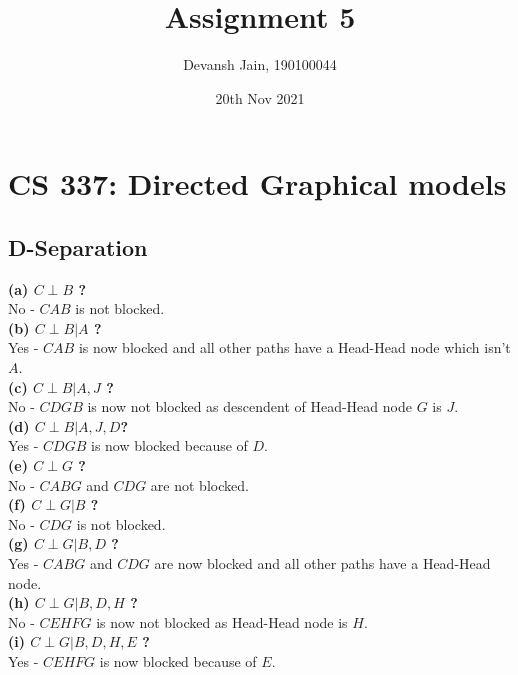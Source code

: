 \documentclass[12pt, fleqn]{article}
\title{Assignment 5}
\author{Devansh Jain, 190100044}
\date{20th Nov 2021}
\begin{document}
\maketitle
\tableofcontents
\thispagestyle{empty}
\setcounter{page}{0}

\newpage
\section{CS 337: Directed Graphical models}
\subsection{D-Separation}
\textbf{(a) $C \perp B$ ?} \\
No - $CAB$ is not blocked. \\

\textbf{(b) $C \perp B \vert A$ ?} \\
Yes - $CAB$ is now blocked and all other paths have a Head-Head node which isn't $A$. \\

\textbf{(c) $C \perp B \vert A, J$ ?} \\
No - $CDGB$ is now not blocked as descendent of Head-Head node $G$ is $J$. \\

\textbf{(d) $C \perp B \vert A, J, D$?} \\
Yes - $CDGB$ is now blocked because of $D$. \\

\textbf{(e) $C \perp G$ ?} \\
No - $CABG$ and $CDG$ are not blocked. \\

\textbf{(f) $C \perp G \vert B$ ?} \\
No - $CDG$ is not blocked. \\

\textbf{(g) $C \perp G \vert B, D$ ?} \\
Yes - $CABG$ and $CDG$ are now blocked and all other paths have a Head-Head node. \\

\textbf{(h) $C \perp G \vert B, D, H$ ?} \\
No - $CEHFG$ is now not blocked as Head-Head node is $H$. \\

\textbf{(i) $C \perp G \vert B, D, H, E$ ?} \\
Yes - $CEHFG$ is now blocked because of $E$. \\
\end{document}
